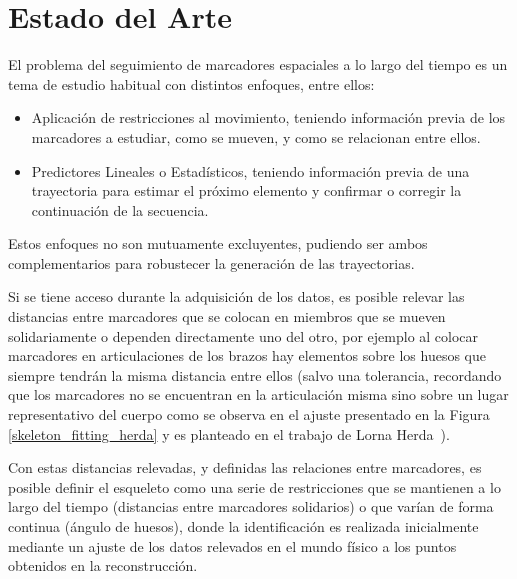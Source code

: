 \section{Estado del Arte}

El problema del seguimiento de marcadores espaciales a lo largo del tiempo es un tema de estudio habitual con distintos enfoques, entre ellos:

\begin{itemize}

\item Aplicación de restricciones al movimiento, teniendo información previa de los marcadores a estudiar, como se mueven, y como se relacionan entre ellos. 

\item Predictores Lineales o Estadísticos, teniendo información previa de una trayectoria para estimar el próximo elemento y confirmar o corregir la continuación de la secuencia.

\end{itemize}

Estos enfoques no son mutuamente excluyentes, pudiendo ser ambos complementarios para robustecer la generación de las trayectorias.


 Si se tiene acceso durante la adquisición de los datos, es posible relevar las distancias entre marcadores que se colocan en miembros que se mueven solidariamente  o dependen directamente uno del otro, por ejemplo al colocar marcadores en articulaciones de los brazos hay elementos sobre los huesos que siempre tendrán la misma distancia entre ellos (salvo una tolerancia, recordando que los marcadores no se encuentran en la articulación misma sino sobre un lugar representativo del cuerpo como se observa en el ajuste presentado en la Figura \ref{skeleton_fitting_herda} y es planteado en el trabajo de Lorna Herda~\cite{herda}). 


Con estas distancias relevadas, y definidas las relaciones entre marcadores, es posible definir el esqueleto como una serie de restricciones que se mantienen a lo largo del tiempo (distancias entre marcadores solidarios) o que varían de forma continua (ángulo de huesos), donde la identificación es realizada inicialmente mediante un ajuste de los datos relevados en el mundo físico a los puntos obtenidos en la reconstrucción. 

